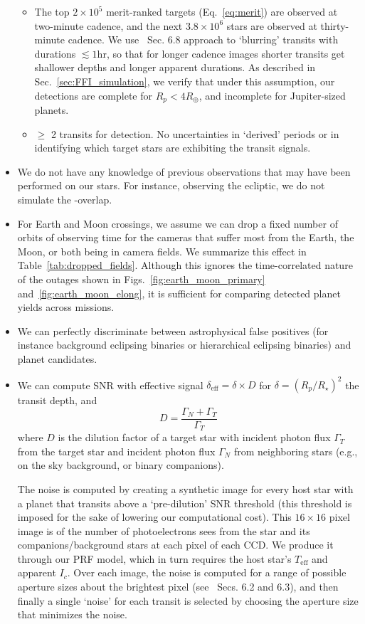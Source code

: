 \begin{itemize}
\begin{itemize}
		\item The top $2\times 10^5$ merit-ranked targets (Eq.~\ref{eq:merit}) are observed at two-minute cadence, and the next $3.8\times10^6$ stars are observed at thirty-minute cadence.
		We use~ Sec. 6.8 approach to `blurring' transits with durations $\lesssim 1\mathrm{hr}$, so that for longer cadence images shorter transits get shallower depths and longer apparent durations.
		As described in Sec.~\ref{sec:FFI_simulation}, we verify that under this assumption, our detections are complete for $R_p<4R_\oplus$, and incomplete for Jupiter-sized planets.
		\item $\geq$ 2 transits for detection. No uncertainties in `derived' periods or in identifying which target stars are exhibiting the transit signals.
	\end{itemize}
	\item We do not have any knowledge of previous observations that may have been performed on our stars.
	For instance, observing the ecliptic, we do not simulate the \tess-\ktwo overlap.
	\item For Earth and Moon crossings, we assume we can drop a fixed number of orbits of observing time for the cameras that suffer most from the Earth, the Moon, or both being in \tesss camera fields. We summarize this effect in Table~\ref{tab:dropped_fields}. Although this ignores the time-correlated nature of the outages shown in Figs.~\ref{fig:earth_moon_primary} and~\ref{fig:earth_moon_elong}, it is sufficient for comparing detected planet yields across missions.
	\item We can perfectly discriminate between astrophysical false positives (for instance background eclipsing binaries or hierarchical eclipsing binaries) and planet candidates.
	\item We can compute SNR with effective signal $\delta_\text{eff} = \delta \times D$ for $\delta=(R_p/R_\star)^2$ the transit depth, and
	\begin{equation}
	D = \frac{\Gamma_N + \Gamma_T}{\Gamma_T} 
	\end{equation}
	where $D$ is the dilution factor of a target star with incident photon flux $\Gamma_T$ from the target star and incident photon flux $\Gamma_N$ from neighboring stars (e.g., on the sky background, or binary companions). 
	
	The noise is computed by creating a synthetic image for every host star with a planet that transits above a `pre-dilution' SNR threshold (this threshold is imposed for the sake of lowering our computational cost).
	This $16\times16$ pixel image is of the number of photoelectrons \tess sees from the star and its companions/background stars at each pixel of each CCD. 
	We produce it through our PRF model, which in turn requires the host star's $T_\mathrm{eff}$ and apparent $I_c$.
	Over each image, the noise is computed for a range of possible aperture sizes about the brightest pixel (see~ Secs. 6.2 and 6.3), and then finally a single `noise' for each transit is selected by choosing the aperture size that minimizes the noise.
\end{itemize}